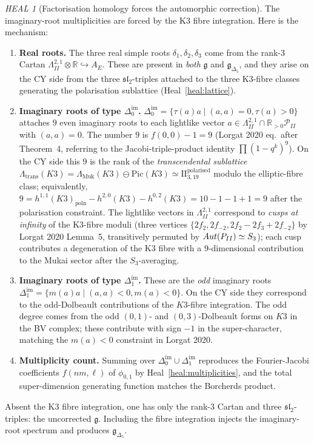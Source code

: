 \documentclass[11pt]{amsart}
\providecommand{\R}{\mathbb{R}}
\providecommand{\fg}{\mathfrak{g}}
\providecommand{\gDelta}{\mathfrak{g}_{\Delta_5}}
\providecommand{\Lat}{\Lambda}
\providecommand{\PII}{\mathcal{P}_{II}}
\theoremstyle{plain}
\theoremstyle{definition}
\theoremstyle{remark}
\newtheorem*{heal}{HEAL}
\begin{document}
\begin{heal}[Factorisation homology forces the automorphic correction]
\label{heal:auto-correction}
The imaginary-root multiplicities are forced by the K3 fibre
integration. Here is the mechanism:
\begin{enumerate}[label=(\roman*),leftmargin=1.5em,itemsep=2pt]
\item \textbf{Real roots.} The three real simple roots
$\delta_1,\delta_2,\delta_3$ come from the rank-$3$ Cartan
$\Lat^{2,1}_{II}\otimes\R\hookrightarrow A_E$. These are present in
\emph{both} $\fg$ and $\gDelta$, and they arise on the CY side from the
three $\mathfrak{sl}_2$-triples attached to the three K3-fibre classes
generating the polarisation sublattice (Heal~\ref{heal:lattice}).
\item \textbf{Imaginary roots of type $\Delta^{\mathrm{im}}_0$.}
$\Delta^{\mathrm{im}}_0=\{\tau(a)a\mid(a,a)=0,\tau(a)>0\}$ attaches $9$
even imaginary roots to each lightlike vector $a\in
\Lat^{2,1}_{II}\cap\R_{>0}\PII$ with $(a,a)=0$. The number $9$ is
$f(0,0)-1=9$ (Lorgat 2020 eq.~after Theorem~4, referring to the
Jacobi-triple-product identity $\prod(1-q^k)^9$). On the CY side this
$9$ is the rank of the \emph{transcendental sublattice}
$\Lat_{\mathrm{trans}}(K3)=\Lat_{\mathrm{Muk}}(K3)\ominus\mathrm{Pic}(K3)
\simeq \mathrm{II}_{3,19}^{\mathrm{polarised}}$ modulo the elliptic-fibre
class; equivalently, $9=h^{1,1}(K3)_{\mathrm{poln}}-h^{2,0}(K3)-
h^{0,2}(K3)=10-1-1+1=9$ after the polarisation constraint. The
lightlike vectors in $\Lat^{2,1}_{II}$ correspond to \emph{cusps at
infinity} of the K3-fibre moduli (three vertices $\{2f_2,2f_{-2},
2f_2-2f_3+2f_{-2}\}$ by Lorgat 2020 Lemma~5, transitively permuted by
$\Aut(\PII)\simeq S_3$); each cusp contributes a degeneration of the
K3 fibre with a $9$-dimensional contribution to the Mukai sector
after the $S_3$-averaging.
\item \textbf{Imaginary roots of type $\Delta^{\mathrm{im}}_1$.} These are
the \emph{odd} imaginary roots $\Delta^{\mathrm{im}}_1=\{m(a)a\mid(a,a)<0,
m(a)<0\}$. On the CY side they correspond to the odd-Dolbeault
contributions of the $K3$-fibre integration. The odd degree comes
from the odd $(0,1)$- and $(0,3)$-Dolbeault forms on $K3$ in the BV
complex; these contribute with sign $-1$ in the super-character,
matching the $m(a)<0$ constraint in Lorgat 2020.
\item \textbf{Multiplicity count.} Summing over $\Delta^{\mathrm{im}}_0
\cup\Delta^{\mathrm{im}}_1$ reproduces the Fourier-Jacobi coefficients
$f(nm,\ell)$ of $\phi_{0,1}$ by Heal~\ref{heal:multiplicities}, and
the total super-dimension generating function matches the Borcherds
product.
\end{enumerate}
Absent the K3 fibre integration, one has only the rank-$3$ Cartan and
three $\mathfrak{sl}_2$-triples: the uncorrected $\fg$. Including the
fibre integration injects the imaginary-root spectrum and produces
$\gDelta$.
\end{heal}
\end{document}
